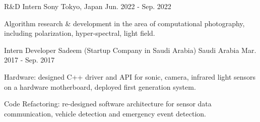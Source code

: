 

\begin{cventries}
  \cventry
  {R\&D Intern} %
  {Sony} %
  {Tokyo, Japan} %
  {Jun. 2022 - Sep. 2022} %
  {
  	\begin{cvitems} %
  		\item {Algorithm research \& development in the area of computational photography, including polarization, hyper-spectral, light field.}
  	\end{cvitems}
  }


  \cventry
    {Intern Developer} %
    {Sadeem (Startup Company in Saudi Arabia)} %
    {Saudi Arabia} %
    {Mar. 2017 - Sep. 2017} %
    {
      \begin{cvitems} %
        \item {Hardware: designed C++ driver and API for sonic, camera, infrared light sensors on a hardware motherboard, deployed first generation system.}
        \item {Code Refactoring: re-designed software architecture for sensor data communication, vehicle detection and emergency event detection.}
      \end{cvitems}
    }


\end{cventries}
